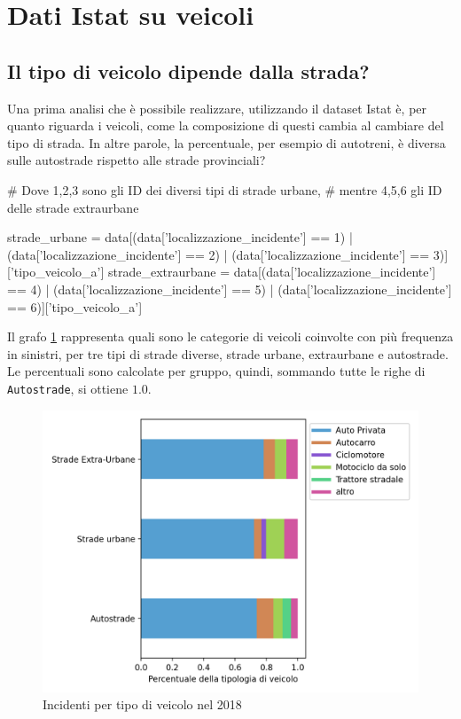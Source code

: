 \documentclass[a4paper,12pt]{report}
\newcommand{\columnstyle}[1]{\texttt{#1}}
\begin{document}
\section{Dati Istat su veicoli}

\subsection{Il tipo di veicolo dipende dalla strada?}

Una prima analisi che è possibile realizzare, utilizzando il dataset Istat è, 
per quanto riguarda i veicoli, 
come la composizione di questi cambia al cambiare del tipo di strada. 
In altre parole, la percentuale, per esempio di autotreni, è diversa sulle autostrade 
rispetto alle strade provinciali? 

\begin{code}[language=Python]
# Dove 1,2,3 sono gli ID dei diversi tipi di strade urbane, 
# mentre 4,5,6 gli ID delle strade extraurbane

strade_urbane = data[(data['localizzazione_incidente'] == 1) | (data['localizzazione_incidente'] == 2) | (data['localizzazione_incidente'] == 3)]['tipo_veicolo_a']
strade_extraurbane = data[(data['localizzazione_incidente'] == 4) | (data['localizzazione_incidente'] == 5) | (data['localizzazione_incidente'] == 6)]['tipo_veicolo_a']
\end{code}

Il grafo \ref{fig:differenza-strade} rappresenta quali sono le categorie di veicoli 
coinvolte con più frequenza in sinistri, per tre tipi di strade diverse, strade urbane, 
extraurbane e autostrade. 
Le percentuali sono calcolate per gruppo, quindi, sommando 
tutte le righe di \columnstyle{Autostrade}, si ottiene $1.0$. 

\begin{figure}
    \includegraphics[width=\linewidth]{../src/incidenti/incidenti_senza_coords/tipo_veicoli/differenza_strade.png}
    \caption{Incidenti per tipo di veicolo nel 2018}
    \label{fig:differenza-strade}
\end{figure}
\end{document}
